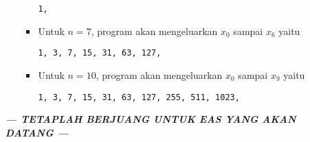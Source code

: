 \documentclass[10pt,openany,a4paper]{article}
\begin{document}
\begin{enumerate}
\begin{enumerate}
\begin{itemize}
\begin{center}
                \texttt{1, }
            \end{center}
            \item Untuk $n=7$, program akan mengeluarkan $x_0$ sampai $x_6$ yaitu
            \begin{center}
                \texttt{1, 3, 7, 15, 31, 63, 127, }
            \end{center}
            \item Untuk $n=10$, program akan mengeluarkan $x_0$ sampai $x_{9}$ yaitu
            \begin{center}
                \texttt{1, 3, 7, 15, 31, 63, 127, 255, 511, 1023, }
            \end{center}
        \end{itemize}
    \end{enumerate}
    \vspace*{1cm}
    \begin{center}
        \textit{\textbf{--- TETAPLAH BERJUANG UNTUK EAS YANG AKAN DATANG ---}}
    \end{center}
    \vspace*{-1cm}
    \begin{figure}[h!]
        \centering
    \end{figure}
\end{enumerate}
\end{document}
